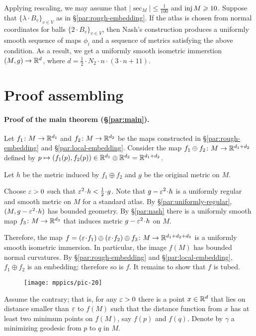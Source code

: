 \documentclass[a4paper,10pt]{article}
\begin{document}
Applying rescaling, we may assume that $|\sec_M|\le \tfrac1{100}$ and $\operatorname{\rm inj} M\geqslant 10$.
Suppose that $\{\lambda\cdot B_v\}_{v\in V}$ as in §\ref{par:rough-embedding}.
If the atlas is chosen from normal coordinates for balls $\{2\cdot B_v\}_{v\in V}$, then Nash's construction produces a uniformly smooth sequence of maps $\phi_i$ and a sequence of metrics satisfying the above condition.
As a result, we get a uniformly smooth isometric immerstion $(M,g)\to \mathbb{R}^d$, where $d= \tfrac12\cdot N_2\cdot n\cdot(3\cdot n+11)$.

\section*{Proof assembling}


\paragraph{Proof of the main theorem (§\ref{par:main}).}\label{par:main-proof}
Let $f_1\colon M\to\mathbb{R}^{d_1}$ and $f_2\colon M\to\mathbb{R}^{d_2}$ be the maps constructed in §\ref{par:rough-embedding} and §\ref{par:local-embedding}.
Consider the map $f_1\oplus f_2\colon M\to \mathbb{R}^{d_1+d_2}$ defined by $p\mapsto (f_1(p),f_2(p))\in \mathbb{R}^{d_1}\oplus\mathbb{R}^{d_2}=\mathbb{R}^{d_1+d_2}$.

Let $h$ be the metric induced by $f_1\oplus f_2$
and $g$ be the original metric on $M$.

Choose $\varepsilon>0$ such that $\eps^2\cdot h<\tfrac12\cdot g$.
Note that $g-\eps^2\cdot h$ is a uniformly regular and smooth metric on $M$ for a standard atlas.
By §\ref{par:uniformly-regular}, $(M,g-\eps^2\cdot h)$ has bounded geometry.
By §\ref{par:nash} there is a uniformly smooth map $f_3\colon M\to\mathbb{R}^{d_3}$ that induces metric $g-\eps^2\cdot h$ on $M$.

Therefore, the map $f=(\eps\cdot f_1)\oplus (\eps\cdot f_2)\oplus f_3\:M\to \RR^{d_1+d_2+d_3}$ is a uniformly smooth isometric immersion.
In particular, the image $f(M)$ has bounded normal curvatures.
By §\ref{par:rough-embedding} and §\ref{par:local-embedding}, $f_1\oplus f_2$ is an embedding;
therefore so is $f$.
It remains to show that $f$ is tubed.


\begin{wrapfigure}{o}{45 mm}
\vskip-0mm
\centering
\texttt{[image: mppics/pic-20]}
\end{wrapfigure}

Assume the contrary;
that is, for any $\varepsilon>0$ there is a point $x\in \mathbb{R}^d$ that lies on distance smaller than $\varepsilon$ to $f(M)$ such that the distance function from $x$ has at least two minimum points on $f(M)$,
say $f(p)$ and $f(q)$.
Denote by $\gamma$ a minimizing geodesic from $p$ to $q$ in $M$.
\end{document}
